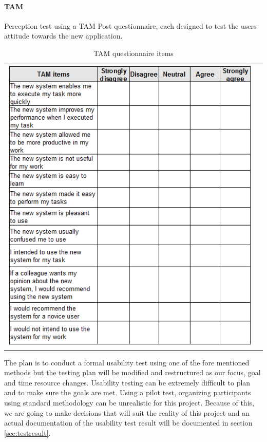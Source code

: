 \paragraph{TAM}
Perception test using a TAM Post questionnaire\cite{tam:doc4, tam:doc6}, each designed to test the users attitude towards the new application.
    \begin{table}[!htb]
        \caption{TAM questionnaire items}
        \centering
        \begin{tabular}{cc}
        \includegraphics[scale=0.97]{reqspec/tamtable.png}
        \end{tabular}
        \label{tab:tam}
    \end{table}

The plan is to conduct a formal usability test using one of the fore mentioned methods  but the testing plan will be modified and restructured as our focus, goal and time resource changes. Usability testing can be extremely difficult to plan and to make sure the goals are met. Using a pilot test, organizing participants using standard methodology can be unrealistic for this  project. Because of this, we are going to make decisions that will suit the reality of this project and an actual documentation of the usability test result will be documented in section \ref{sec:testresult}.
\newpage

